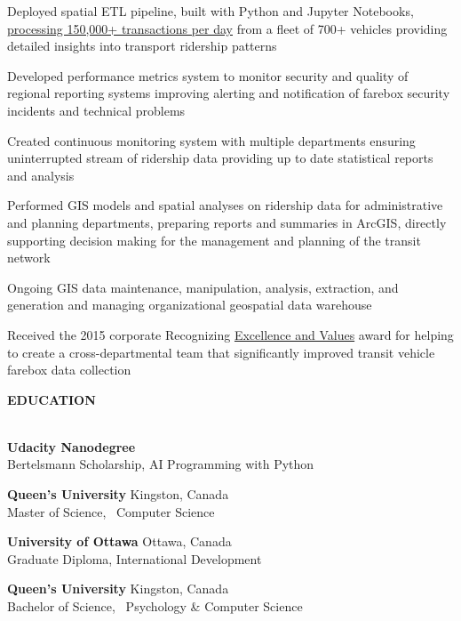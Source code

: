 \documentclass[letterpaper]{article}
\newcommand{\lineunder} {
        \vspace*{-8pt} \\
        \hspace*{-18pt} \hrulefill \\
    }
\newcommand{\header} [1] {
        \vspace{9pt}
        {\hspace*{-18pt}\vspace*{6pt} \large \textbf {#1}}
        \vspace*{-6pt} \lineunder
        \vspace{2pt}
    }
\newenvironment{jobtasklist}
        {
            \vspace{-12pt}
            \begin{itemize} \itemsep 0pt
        }{
            \end{itemize}
            \vspace{-3pt}
        }
\newcommand{\university}[3]{
        \textbf{#1}  %
        \hfill #2\\  %
        #3\\         %
        \vspace{2mm}
    }
\newcommand{\impt}[1]{\uline{#1}}
\begin{document}
\begin{jobtasklist}
{        \item Deployed spatial ETL pipeline, built with Python and Jupyter Notebooks,
                \impt{processing 150,000+ transactions per day} from a fleet of 700+ vehicles
                providing detailed insights into transport ridership patterns

        \item Developed performance metrics system to monitor security and quality
                of regional reporting systems improving alerting and notification of
                farebox security incidents and technical problems

        \item Created continuous monitoring system with multiple departments
                ensuring uninterrupted stream of ridership data
                providing up to date statistical reports and analysis

        \item Performed GIS models and spatial analyses on ridership data for administrative
                and planning departments, preparing reports and summaries in ArcGIS,
                directly supporting decision making for the management and planning of the
                transit network

        \item Ongoing GIS data maintenance, manipulation, analysis, extraction, and generation
                and managing organizational geospatial data warehouse

        \item Received the 2015 corporate Recognizing \impt{Excellence and Values} award
                for helping to create a cross-departmental team that significantly
                improved transit vehicle farebox data collection
    }


\end{jobtasklist}



\header{EDUCATION}
    \university
        {Udacity Nanodegree}
        {}
        {Bertelsmann Scholarship, AI Programming with Python}
    \university
        {Queen's University}
        {Kingston, Canada}
        {Master of Science, ~Computer Science}

    \university
        {University of Ottawa}
        {Ottawa, Canada}
        {Graduate Diploma, International Development}

    \university
        {Queen's University}
        {Kingston, Canada}
        {Bachelor of Science, ~Psychology \& Computer Science}
\end{document}
